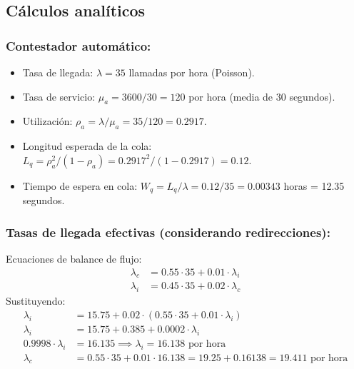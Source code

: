 \documentclass[12pt]{article}
\begin{document}
\subsection{Cálculos analíticos}

\subsubsection{Contestador automático:}
\begin{itemize}
    \item Tasa de llegada: $\lambda = 35$ llamadas por hora (Poisson).
    \item Tasa de servicio: $\mu_a = 3600/30 = 120$ por hora (media de 30 segundos).
    \item Utilización: $\rho_a = \lambda/\mu_a = 35/120 = 0.2917$.
    \item Longitud esperada de la cola: $L_q = \rho_a^2/(1 - \rho_a) = 0.2917^2/(1 - 0.2917) = 0.12$.
    \item Tiempo de espera en cola: $W_q = L_q/\lambda = 0.12/35 = 0.00343$ horas = 12.35 segundos.
\end{itemize}

\subsubsection{Tasas de llegada efectivas (considerando redirecciones):}
Ecuaciones de balance de flujo:
\begin{align*}
    \lambda_c &= 0.55 \cdot 35 + 0.01 \cdot \lambda_i \\
    \lambda_i &= 0.45 \cdot 35 + 0.02 \cdot \lambda_c
\end{align*}
Sustituyendo:
\begin{align*}
    \lambda_i &= 15.75 + 0.02 \cdot (0.55 \cdot 35 + 0.01 \cdot \lambda_i) \\
    \lambda_i &= 15.75 + 0.385 + 0.0002 \cdot \lambda_i \\
    0.9998 \cdot \lambda_i &= 16.135 \implies \lambda_i = 16.138 \text{ por hora} \\
    \lambda_c &= 0.55 \cdot 35 + 0.01 \cdot 16.138 = 19.25 + 0.16138 = 19.411 \text{ por hora}
\end{align*}
\end{document}
